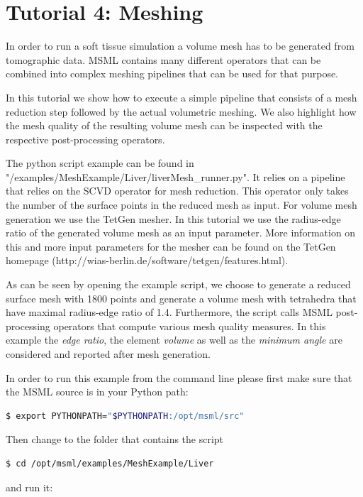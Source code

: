 \chapter{Tutorial 4: Meshing}

In order to run a soft tissue simulation a volume mesh has to be generated from tomographic data. MSML contains many different operators that can be combined into complex meshing pipelines that can be used for that purpose.

In this tutorial we show how to execute a simple pipeline that consists of a mesh reduction step followed by the actual volumetric meshing. We also highlight how the mesh quality of the resulting volume mesh can be inspected with the respective post-processing operators.

The python script example can be found in "/examples/MeshExample/Liver/liverMesh\_runner.py". It relies on a pipeline that relies on the SCVD operator for mesh reduction. This operator only takes the number of the surface points in the reduced mesh as input. For volume mesh generation we use the TetGen mesher. In this tutorial we use the radius-edge ratio of the generated volume mesh as an input parameter. More information on this and more input parameters for the mesher can be found on the TetGen homepage (http://wias-berlin.de/software/tetgen/features.html).

As can be seen by opening the example script, we choose to generate a reduced surface mesh with 1800 points and generate a volume mesh with tetrahedra that have maximal radius-edge ratio of 1.4. Furthermore, the script calls MSML post-processing operators that compute various mesh quality measures. In this example the \emph{edge ratio}, the element \emph{volume} as well as the \emph{minimum angle} are considered and reported after mesh generation.


In order to run this example from the command line please first make sure that the MSML source is in your Python path:
\begin{lstlisting}[language=sh, breaklines=true]
$ export PYTHONPATH="$PYTHONPATH:/opt/msml/src"
\end{lstlisting}

Then change to the folder that contains the script

\begin{lstlisting}[language=sh, breaklines=true]
$ cd /opt/msml/examples/MeshExample/Liver
\end{lstlisting}

and run it:

